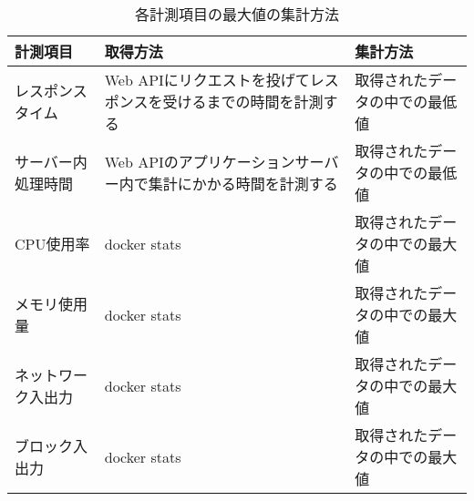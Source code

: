 \documentclass[../../../../main]{subfiles}
\begin{document}
    \begin{table}[htbp]
        \centering
        \caption{各計測項目の最大値の集計方法}
        \label{tab:max-aggregation-method}
        \begin{tabular}{|l|p{6cm}|l|}
            \hline
            \textbf{計測項目} & \textbf{取得方法}                        & \textbf{集計方法}   \\ \hline
            レスポンスタイム      & Web APIにリクエストを投げてレスポンスを受けるまでの時間を計測する & 取得されたデータの中での最低値 \\ \hline
            サーバー内処理時間     & Web APIのアプリケーションサーバー内で集計にかかる時間を計測する  & 取得されたデータの中での最低値 \\ \hline
            CPU使用率        & docker stats                         & 取得されたデータの中での最大値 \\ \hline
            メモリ使用量        & docker stats                         & 取得されたデータの中での最大値 \\ \hline
            ネットワーク入出力     & docker stats                         & 取得されたデータの中での最大値 \\ \hline
            ブロック入出力       & docker stats                         & 取得されたデータの中での最大値 \\ \hline
        \end{tabular}
    \end{table}
\end{document}
